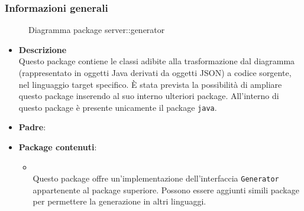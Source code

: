 \subsubsection{Informazioni generali}
\begin{figure}[H]
	\caption{Diagramma package server::generator}
\end{figure}
\begin{itemize}
\item \textbf{Descrizione}\\
Questo package contiene le classi adibite alla trasformazione dal diagramma (rappresentato in oggetti Java derivati da oggetti JSON) a codice sorgente, nel linguaggio target specifico. È stata prevista la possibilità di ampliare questo package inserendo al suo interno ulteriori package. All'interno di questo package è presente unicamente il package \texttt{java}.
\item \textbf{Padre}: \hyperref[\nogloxy{swedesigner::server}]{}
\item \textbf{Package contenuti}:
\begin{itemize}
\item \hyperref[\nogloxy{swedesigner::server::generator::java}]{}\\
Questo package offre un'implementazione dell'interfaccia \texttt{Generator} appartenente al package superiore. Possono essere aggiunti simili package per permettere la generazione in altri linguaggi.
\end{itemize}
\end{itemize}
